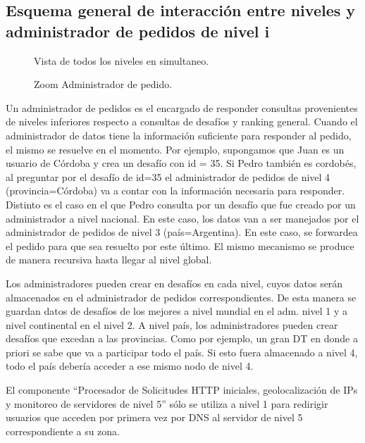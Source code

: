 \subsection{Esquema general de interacción entre niveles y administrador de pedidos de nivel i}

\begin{figure}[H]
   \centering
   \caption{Vista de todos los niveles en simultaneo.}
\end{figure}

\begin{figure}[H]
   \centering
   \caption{Zoom Administrador de pedido.}
\end{figure}

Un administrador de pedidos es el encargado de responder consultas provenientes de niveles inferiores respecto a consultas de desafíos y ranking general. Cuando el administrador de datos tiene la información suficiente para responder al pedido, el
mismo se resuelve en el momento. Por ejemplo, supongamos que Juan es un usuario de Córdoba y crea un desafío con id = 35.
Si Pedro también es cordobés, al preguntar por el desafío de id=35 el administrador de pedidos de nivel 4 (provincia=Córdoba) va a contar con la información necesaria para responder.
Distinto es el caso en el que Pedro consulta por un desafío que fue creado por un administrador a nivel nacional. En este caso, los datos van a ser manejados por el administrador de pedidos de nivel 3 (país=Argentina). En este caso, se forwardea el
pedido para que sea resuelto por este último.
El mismo mecanismo se produce de manera recursiva hasta llegar al nivel global.

Los administradores pueden crear en desafíos en cada nivel, cuyos datos serán almacenados en el administrador de pedidos
correspondientes. De esta manera se guardan datos de desafíos de los mejores a nivel mundial en el adm. nivel 1 y a nivel continental en el nivel 2. A nivel país, los administradores pueden crear desafíos que excedan a las provincias. Como por ejemplo, un gran DT en donde a priori se sabe que va a participar todo el país. Si esto fuera almacenado a nivel 4, todo el país debería acceder a ese mismo nodo de nivel 4.

El componente ``Procesador de Solicitudes HTTP iniciales, geolocalización de IPs y monitoreo de servidores de nivel 5'' sólo se utiliza a nivel 1 para redirigir usuarios que acceden por primera vez por DNS al servidor de nivel 5 correspondiente a su zona.

